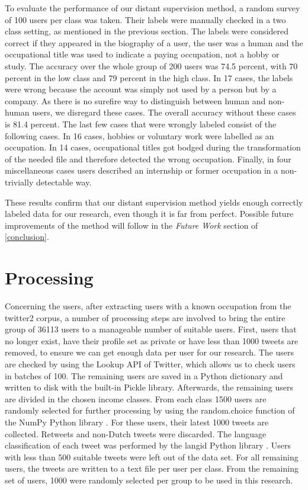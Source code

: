 \documentclass[
10pt, %
a4paper, %
oneside, %
headinclude,footinclude, %
] {book}%
\begin{document}
To evaluate the performance of our distant supervision method, a random survey of 100 users per class was taken. Their labels were manually checked in a two class setting, as mentioned in the previous section. The labels were considered correct if they appeared in the biography of a user, the user was a human and the occupational title was used to indicate a paying occupation, not a hobby or study. The accuracy over the whole group of 200 users was 74.5 percent, with 70 percent in the low class and 79 percent in the high class. In 17 cases, the labels were wrong because the account was simply not used by a person but by a company. As there is no surefire way to distinguish between human and non-human users, we disregard these cases. The overall accuracy without these cases is 81.4 percent. The last few cases that were wrongly labeled consist of the following cases. In 16 cases, hobbies or voluntary work were labelled as an occupation. In 14 cases, occupational titles got bodged during the transformation of the needed file and therefore detected the wrong occupation. Finally, in four miscellaneous cases users described an internship or former occupation in a non-trivially detectable way.

These results confirm that our distant supervision method yields enough correctly labeled data for our research, even though it is far from perfect. Possible future improvements of the method will follow in the \textit{Future Work} section of \autoref{conclusion}.

\section{Processing}
\label{sec:processing}
Concerning the users, after extracting users with a known occupation from the twitter2 corpus, a number of processing steps are involved to bring the entire group of 36113 users to a manageable number of suitable users. First, users that no longer exist, have their profile set as private or have less than 1000 tweets are removed, to ensure we can get enough data per user for our research. The users are checked by using the Lookup API of Twitter, which allows us to check users in batches of 100. The remaining users are saved in a Python dictionary and written to disk with the built-in Pickle library. Afterwards, the remaining users are divided in the chosen income classes. From each class 1500 users are randomly selected for further processing by using the random.choice function of the NumPy Python library \citep{numpy}. For these users, their latest 1000 tweets are collected. Retweets and non-Dutch tweets were discarded. The language classification of each tweet was performed by the langid Python library \citep{langid}. Users with less than 500 suitable tweets were left out of the data set. For all remaining users, the tweets are written to a text file per user per class. From the remaining set of users, 1000 were randomly selected per group to be used in this research.
\end{document}
